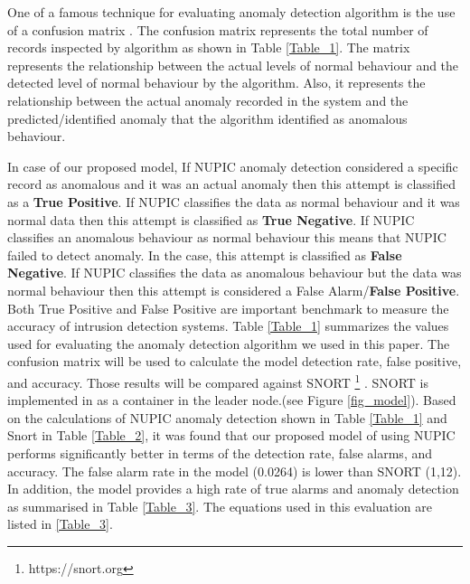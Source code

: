 \documentclass[sigconf]{acmart}
\begin{document}
One of a famous technique for evaluating anomaly detection algorithm is the use of a confusion matrix \cite{kohavi1998confusion}. The confusion matrix represents the total number of records inspected by algorithm as shown in Table \ref{Table_1}. The matrix represents the relationship between the actual levels of normal behaviour and the detected level of normal behaviour by the algorithm. Also, it represents the relationship between the actual anomaly recorded in the system and the predicted/identified anomaly that the algorithm identified as anomalous behaviour.   

In case of our proposed model, If NUPIC anomaly detection considered a specific record as anomalous and it was an actual anomaly then this attempt is classified as a \textbf{True Positive}. If NUPIC classifies the data as normal behaviour and it was normal data then this attempt is classified as \textbf{True Negative}. If NUPIC classifies an anomalous behaviour as normal behaviour this means that NUPIC failed to detect anomaly. In the case, this attempt is classified as \textbf{False Negative}. If NUPIC classifies the data as anomalous behaviour but the data was normal behaviour then this attempt is considered a False Alarm/\textbf{False Positive}. Both True Positive and False Positive are important benchmark to measure the accuracy of intrusion detection systems. Table \ref{Table_1} summarizes the values used for evaluating the anomaly detection algorithm we used in this paper. The confusion matrix will be used to calculate the model detection rate, false positive, and accuracy. Those results will be compared against SNORT \footnote{https://snort.org} \cite{roesch1999snort}. SNORT is implemented in as a container in the leader node.(see Figure \ref{fig_model}). Based on the calculations of NUPIC anomaly detection shown in Table \ref{Table_1} and Snort in Table \ref{Table_2}, it was found that our proposed model of using NUPIC performs significantly better in terms of the detection rate, false alarms, and accuracy. The false alarm rate in the model (0.0264) is lower than SNORT (1,12). In addition, the model provides a high rate of true alarms and anomaly detection as summarised in Table \ref{Table_3}. The equations used in this evaluation are listed in \ref{Table_3}.    
 
\begin{table}[h!]
\centering

\caption{Results of the proposed anomalies detection model on confusion matrix}
\end{table}
\end{document}
